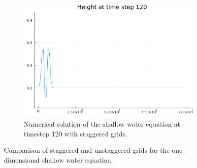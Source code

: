 \begin{figure}[h]
\begin{subfigure}[b]{0.3\textwidth}
        \includegraphics[width=\textwidth]{./images/height-swe1d-staggered-grid-120.png}
        \caption{Numerical solution of the shallow water equation at timestep 120 with staggered grids.}
        \label{fig:staggered120}
    \end{subfigure}

    \caption{Comparison of staggered and unstaggered grids for the one-dimensional shallow water equation.}
    \label{fig:1dswe}
\end{figure}


